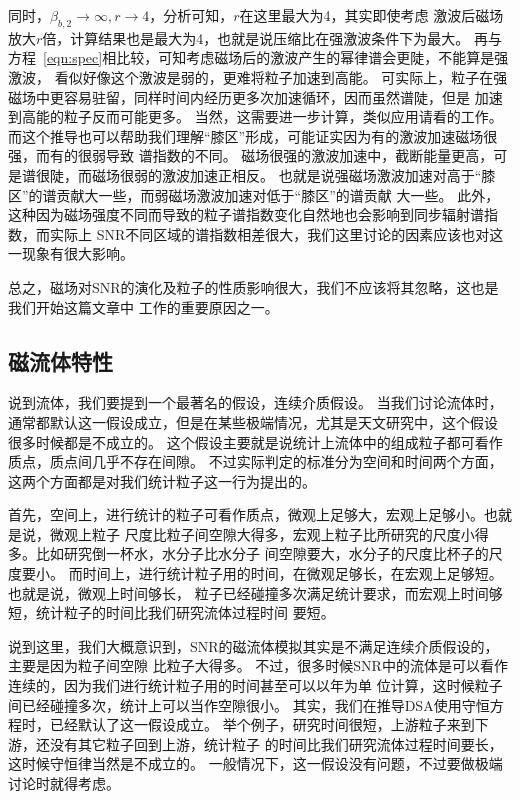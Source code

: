 同时，$\beta_{b,2}\to \infty, r\to4$，分析可知，$r$在这里最大为4，其实即使考虑
激波后磁场放大$r$倍，计算结果也是最大为4，也就是说压缩比在强激波条件下为最大。
再与方程~\ref{eqn:spec}相比较，可知考虑磁场后的激波产生的幂律谱会更陡，不能算是强激波，
看似好像这个激波是弱的，更难将粒子加速到高能。
可实际上，粒子在强磁场中更容易驻留，同样时间内经历更多次加速循环，因而虽然谱陡，但是
加速到高能的粒子反而可能更多。
当然，这需要进一步计算，类似应用请看\citet{Zirakashvili2018}的工作。
而这个推导也可以帮助我们理解“膝区”形成，可能证实因为有的激波加速磁场很强，而有的很弱导致
谱指数的不同。
磁场很强的激波加速中，截断能量更高，可是谱很陡，而磁场很弱的激波加速正相反。
也就是说强磁场激波加速对高于“膝区”的谱贡献大一些，而弱磁场激波加速对低于“膝区”的谱贡献
大一些。
此外，这种因为磁场强度不同而导致的粒子谱指数变化自然地也会影响到同步辐射谱指数，而实际上
SNR不同区域的谱指数相差很大\citep{Leahy2005, Tian2005}，我们这里讨论的因素应该也对这
一现象有很大影响。

总之，磁场对SNR的演化及粒子的性质影响很大，我们不应该将其忽略，这也是我们开始这篇文章中
工作的重要原因之一。

\subsection{磁流体特性}
说到流体，我们要提到一个最著名的假设，连续介质假设。
当我们讨论流体时，通常都默认这一假设成立，但是在某些极端情况，尤其是天文研究中，这个假设
很多时候都是不成立的。
这个假设主要就是说统计上流体中的组成粒子都可看作质点，质点间几乎不存在间隙\citep{hd}。
不过实际判定的标准分为空间和时间两个方面，这两个方面都是对我们统计粒子这一行为提出的。

首先，空间上，进行统计的粒子可看作质点，微观上足够大，宏观上足够小。也就是说，微观上粒子
尺度比粒子间空隙大得多，宏观上粒子比所研究的尺度小得多。比如研究倒一杯水，水分子比水分子
间空隙要大，水分子的尺度比杯子的尺度要小。
而时间上，进行统计粒子用的时间，在微观足够长，在宏观上足够短。也就是说，微观上时间够长，
粒子已经碰撞多次满足统计要求，而宏观上时间够短，统计粒子的时间比我们研究流体过程时间
要短。

说到这里，我们大概意识到，SNR的磁流体模拟其实是不满足连续介质假设的，主要是因为粒子间空隙
比粒子大得多。
不过，很多时候SNR中的流体是可以看作连续的，因为我们进行统计粒子用的时间甚至可以以年为单
位计算，这时候粒子间已经碰撞多次，统计上可以当作空隙很小。
其实，我们在推导DSA使用守恒方程时，已经默认了这一假设成立。
举个例子，研究时间很短，上游粒子来到下游，还没有其它粒子回到上游，统计粒子
的时间比我们研究流体过程时间要长，这时候守恒律当然是不成立的。
一般情况下，这一假设没有问题，不过要做极端讨论时就得考虑。

